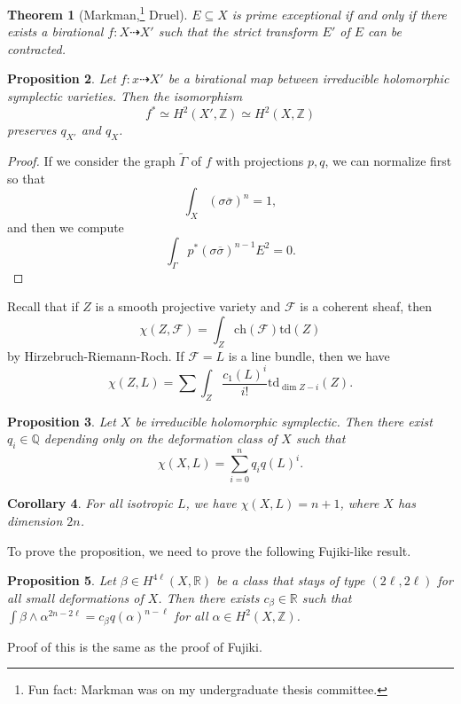 \documentclass[leqno, openany]{memoir}
\newtheorem{thm}{Theorem}[section]
\newtheorem{cor}[thm]{Corollary}
\newtheorem{prop}[thm]{Proposition}
\theoremstyle{definition}
\theoremstyle{remark}
\theoremstyle{plain}
\theoremstyle{definition}
\theoremstyle{remark}
\newcommand{\R}{\mathbb{R}}
\newcommand{\Z}{\mathbb{Z}}
\newcommand{\Q}{\mathbb{Q}}
\newcommand{\mc}[1]{\mathcal{#1}}
\newcommand{\mr}[1]{\mathrm{#1}}
\newcommand{\ol}[1]{\overline{#1}}
\newcommand{\wt}[1]{\widetilde{#1}}
\begin{document}
\begin{thm}[Markman,\footnote{Fun fact: Markman was on my undergraduate thesis committee.} Druel]
    $E \subseteq X$ is prime exceptional if and only if there exists a birational $f \colon X \dashrightarrow X'$ such that the strict transform $E'$ of $E$ can be contracted.
\end{thm}

\begin{prop}
    Let $f \colon x \dashrightarrow X'$ be a birational map between irreducible holomorphic symplectic varieties. Then the isomorphism
    \[ f^* \simeq H^2(X', \Z) \simeq H^2(X, \Z) \]
    preserves $q_{X'}$ and $q_X$.
\end{prop}

\begin{proof}
    If we consider the graph $\wt{\Gamma}$ of $f$ with projections $p, q$, we can normalize first so that 
    \[ \int_X (\sigma \ol{\sigma})^n = 1, \]
    and then we compute
    \[ \int_{\Gamma} p^*(\sigma \ol{\sigma})^{n-1} E^2 = 0. \]
\end{proof}

Recall that if $Z$ is a smooth projective variety and $\mc{F}$ is a coherent sheaf, then
\[ \chi(Z, \mc{F}) = \int_Z \mr{ch}(\mc{F}) \mr{td}(Z) \]
by Hirzebruch-Riemann-Roch. If $\mc{F} = L$ is a line bundle, then we have
\[ \chi(Z, L) = \sum \int_Z \frac{c_1(L)^i}{i!} \mr{td}_{\dim Z - i}(Z). \]

\begin{prop}
    Let $X$ be irreducible holomorphic symplectic. Then there exist $q_i \in \Q$ depending only on the deformation class of $X$ such that
    \[ \chi(X, L) = \sum_{i=0}^n q_i q(L)^i. \]
\end{prop}

\begin{cor}
    For all isotropic $L$, we have $\chi(X, L) = n+1$, where $X$ has dimension $2n$.
\end{cor}

To prove the proposition, we need to prove the following Fujiki-like result.
\begin{prop}
    Let $\beta \in H^{4\ell}(X, \R)$ be a class that stays of type $(2\ell, 2\ell)$ for all small deformations of $X$. Then there exists $c_{\beta} \in \R$ such that $\int \beta \wedge \alpha^{2n-2\ell} = c_{\beta} q(\alpha)^{n-\ell}$ for all $\alpha \in H^2(X, \Z)$.
\end{prop}
Proof of this is the same as the proof of Fujiki.
\end{document}
